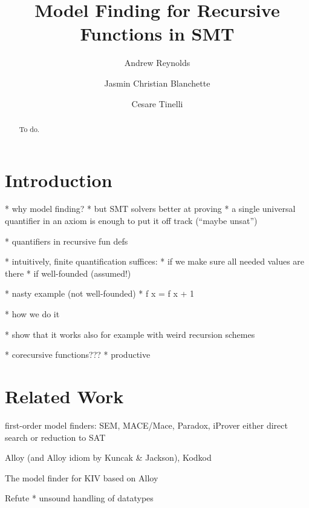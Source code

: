 \documentclass[runningheads,a4paper]{llncs}
\begin{document}
\title{Model Finding for Recursive Functions in SMT}

\author {Andrew Reynolds \and Jasmin Christian Blanchette \and Cesare Tinelli }

\maketitle

\begin{abstract}
To do.
\end{abstract}

\section{Introduction}
\label{sec:introduction}

  * why model finding?
  * but SMT solvers better at proving
    * a single universal quantifier in an axiom is enough to put it off track
      (``maybe unsat'')

  * quantifiers in recursive fun defs

  * intuitively, finite quantification suffices:
    * if we make sure all needed values are there
    * if well-founded (assumed!)

  * nasty example (not well-founded)
    * f x = f x + 1

  * how we do it

  * show that it works also for example with weird recursion schemes

  * corecursive functions???
    * productive

\section{Related Work}

first-order model finders: SEM, MACE/Mace, Paradox, iProver
  either direct search or reduction to SAT

Alloy (and Alloy idiom by Kuncak \& Jackson), Kodkod

The model finder for KIV based on Alloy

Refute
  * unsound handling of datatypes
\end{document}
